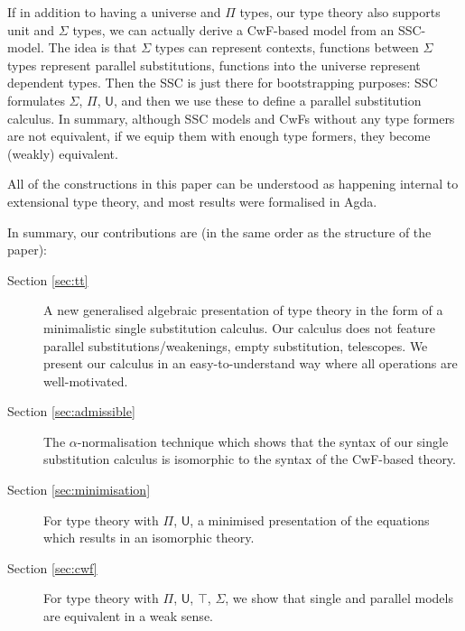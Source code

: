 \documentclass[a4paper,UKenglish]{article}
\newcommand{\U}{\mathsf{U}}
\begin{document}
If in addition to having a universe and $\Pi$ types, our type theory
also supports unit and $\Sigma$ types, we can actually derive a
CwF-based model from an SSC-model. The idea is that $\Sigma$ types can
represent contexts, functions between $\Sigma$ types represent
parallel substitutions, functions into the universe represent
dependent types. Then the SSC is just there for bootstrapping
purposes: SSC formulates $\Sigma$, $\Pi$, $\U$, and then
we use these to define a parallel substitution calculus. In summary,
although SSC models and CwFs without any type formers are not
equivalent, if we equip them with enough type formers, they become
(weakly) equivalent.

All of the constructions in this paper can be understood as happening
internal to extensional type theory, and most results were formalised
in Agda. %

In summary, our contributions are (in the same order as the structure of the paper):
\begin{description}
\item[Section \ref{sec:tt}] A new generalised algebraic presentation of type theory in the
  form of a minimalistic single substitution calculus. Our calculus
  does not feature parallel substitutions/weakenings, empty
  substitution, telescopes. We present our calculus in an
  easy-to-understand way where all operations are well-motivated.
\item[Section \ref{sec:admissible}] The $\alpha$-normalisation technique which shows that the syntax
  of our single substitution calculus is isomorphic to the syntax of
  the CwF-based theory.
\item[Section \ref{sec:minimisation}] For type theory with $\Pi$, $\U$, a minimised presentation of
  the equations which results in an isomorphic theory.
\item[Section \ref{sec:cwf}] For type theory with $\Pi$, $\U$, $\top$, $\Sigma$, we show that
  single and parallel models are equivalent in a weak sense.
\end{description}

% 
\end{document}
